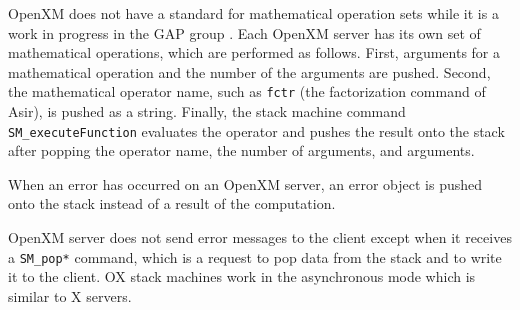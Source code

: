 OpenXM does not have a standard for mathematical operation sets
while it is a work in progress in the GAP group \cite{gap}.
Each OpenXM server has its own set of mathematical operations,
which are performed as follows.
First, arguments for a mathematical operation
and the number of the arguments are pushed.
Second, 
the mathematical operator name, 
such as {\tt fctr} (the factorization command of Asir),
is pushed as a string.
Finally, the stack machine command
{\tt SM\_executeFunction} evaluates the operator and
pushes the result onto the stack
after popping the operator name, the number of arguments,
and arguments.

When an error has occurred on an OpenXM server,
an error object is pushed onto the stack 
instead of a result of the computation.

OpenXM server does not send error messages to the client
except when it receives a {\tt SM\_pop*} command, 
which is a request to pop data from the stack and to write it to the client.
OX stack machines work in the asynchronous mode which is similar 
to X servers.





